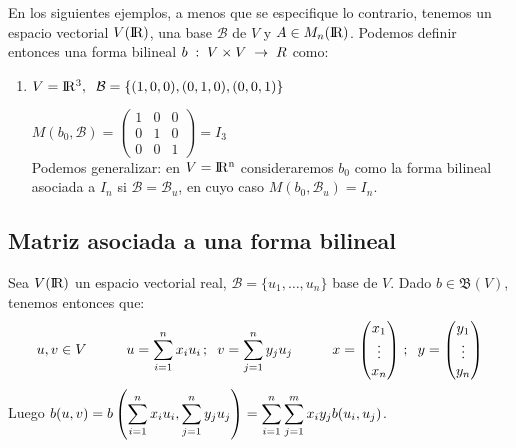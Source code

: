 \documentclass[10pt, a4paper]{article}
\theoremstyle{theorem-style}
\theoremstyle{definition-style}
\theoremstyle{remark-style}
\theoremstyle{example-style}
\theoremstyle{definition-style}
\theoremstyle{remark-style}
\begin{document}
En los siguientes ejemplos, a menos que se especifique lo contrario, tenemos un espacio vectorial $V(\rm I\!R)$, una base $\mathcal{B}$ de $V$ y $A \in M_n(\rm I\!R)$. Podemos definir entonces una forma bilineal $b \hspace{1mm} : \hspace{1mm} V\times V \hspace{1mm} \rightarrow \hspace{1mm} R$ como:

\begin{enumerate}
	\item $V=\rm I\!R^3, \hspace{2mm} \mathcal{B} = \{(1,0,0),(0,1,0),(0,0,1)\}$
	
	$M(b_0, \mathcal{B}) = \left( \begin{matrix} 1&0&0\\0&1&0\\0&0&1 \end{matrix} \right) = I_3$ \\
	
	Podemos generalizar: en $V = \rm I\!R^n$ consideraremos $b_0$ como la forma bilineal asociada a $I_n$ si $\mathcal{B} = \mathcal{B}_u$, en cuyo caso $M(b_0, \mathcal{B}_u) = I_n$.
	
\end{enumerate}

\pagebreak

\subsection{Matriz asociada a una forma bilineal}
Sea $V(\rm I\!R)$ un espacio vectorial real, $\mathcal{B} = \{u_1, \ldots, u_n\}$ base de $V$. Dado $b \in \mathfrak{B}(V)$, tenemos entonces que:
$$ u,v \in V \hspace{1cm} u=\sum_{i=1}^n x_i u_i\hspace{0.5mm}; \hspace{2mm} v = \sum_{j=1}^n y_ju_j \hspace{1cm}
	x = \left( \begin{matrix} x_1 \\ \vdots \\ x_n \end{matrix} \right)\hspace{0.5mm}; \hspace{2mm}
	y = \left( \begin{matrix} y_1 \\ \vdots \\ y_n \end{matrix} \right)$$
Luego $ \mathlarger{b(u,v)=b\left(\sum_{i=1}^n x_iu_i, \sum_{j=1}^n y_ju_j\right) = \sum_{i=1}^n \sum_{j=1}^m x_i y_j b(u_i,u_j)}$.
\end{document}

